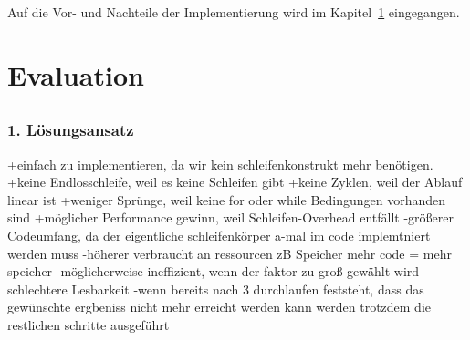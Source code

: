 \documentclass{article}
\begin{document}
    Auf die Vor- und Nachteile der Implementierung wird im Kapitel~\ref{Evaluation} eingegangen.
    \newpage
    \section{Evaluation}
    \label{Evaluation}
    \subsection{}
    \subsubsection{1. Lösungsansatz}
    +einfach zu implementieren, da wir kein schleifenkonstrukt mehr benötigen.
    +keine Endlosschleife, weil es keine Schleifen gibt
    +keine Zyklen, weil der Ablauf linear ist
    +weniger Sprünge, weil keine for oder while Bedingungen vorhanden sind
    +möglicher Performance gewinn, weil Schleifen-Overhead entfällt
    -größerer Codeumfang, da der eigentliche schleifenkörper a-mal im code implemtniert werden muss 
    -höherer verbraucht an ressourcen zB Speicher mehr code = mehr speicher
    -möglicherweise ineffizient, wenn der faktor zu groß gewählt wird
    -schlechtere Lesbarkeit
    -wenn bereits nach 3 durchlaufen feststeht, dass das gewünschte ergbeniss nicht mehr erreicht werden kann werden trotzdem die restlichen schritte ausgeführt
\end{document}
